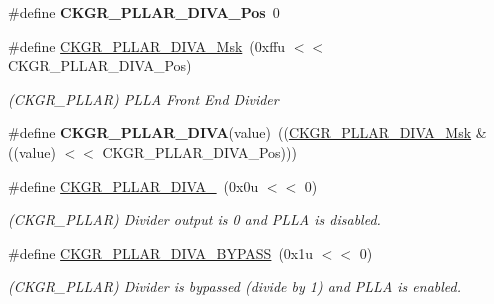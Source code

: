 \begin{DoxyCompactItemize}
\#define {\bfseries C\+K\+G\+R\+\_\+\+P\+L\+L\+A\+R\+\_\+\+D\+I\+V\+A\+\_\+\+Pos}~0
\item 
\mbox{\label{group__SAME70__PMC_gab28dc8be7b52a0a8eb5031a21f1991d0}} 
\#define \mbox{\hyperlink{group__SAME70__PMC_gab28dc8be7b52a0a8eb5031a21f1991d0}{C\+K\+G\+R\+\_\+\+P\+L\+L\+A\+R\+\_\+\+D\+I\+V\+A\+\_\+\+Msk}}~(0xffu $<$$<$ C\+K\+G\+R\+\_\+\+P\+L\+L\+A\+R\+\_\+\+D\+I\+V\+A\+\_\+\+Pos)
\begin{DoxyCompactList}\small\item\em (C\+K\+G\+R\+\_\+\+P\+L\+L\+AR) P\+L\+LA Front End Divider \end{DoxyCompactList}\item 
\mbox{\label{group__SAME70__PMC_ga37e2da797562a8a8e9e59e3ec7a04528}} 
\#define {\bfseries C\+K\+G\+R\+\_\+\+P\+L\+L\+A\+R\+\_\+\+D\+I\+VA}(value)~((\mbox{\hyperlink{group__SAMV71__PMC_gab28dc8be7b52a0a8eb5031a21f1991d0}{C\+K\+G\+R\+\_\+\+P\+L\+L\+A\+R\+\_\+\+D\+I\+V\+A\+\_\+\+Msk}} \& ((value) $<$$<$ C\+K\+G\+R\+\_\+\+P\+L\+L\+A\+R\+\_\+\+D\+I\+V\+A\+\_\+\+Pos)))
\item 
\mbox{\label{group__SAME70__PMC_gad605ace85fa67153f1682aeb90b1b5e5}} 
\#define \mbox{\hyperlink{group__SAME70__PMC_gad605ace85fa67153f1682aeb90b1b5e5}{C\+K\+G\+R\+\_\+\+P\+L\+L\+A\+R\+\_\+\+D\+I\+V\+A\+\_}}~(0x0u $<$$<$ 0)
\begin{DoxyCompactList}\small\item\em (C\+K\+G\+R\+\_\+\+P\+L\+L\+AR) Divider output is 0 and P\+L\+LA is disabled. \end{DoxyCompactList}\item 
\mbox{\label{group__SAME70__PMC_ga20d7b7780216bc45bee25bec4438b4eb}} 
\#define \mbox{\hyperlink{group__SAME70__PMC_ga20d7b7780216bc45bee25bec4438b4eb}{C\+K\+G\+R\+\_\+\+P\+L\+L\+A\+R\+\_\+\+D\+I\+V\+A\+\_\+\+B\+Y\+P\+A\+SS}}~(0x1u $<$$<$ 0)
\begin{DoxyCompactList}\small\item\em (C\+K\+G\+R\+\_\+\+P\+L\+L\+AR) Divider is bypassed (divide by 1) and P\+L\+LA is enabled. \end{DoxyCompactList}\item 
\mbox{\label{group__SAME70__PMC_ga79c2a1a20693793a073171ca87cbca62}} 

\end{DoxyCompactItemize}
